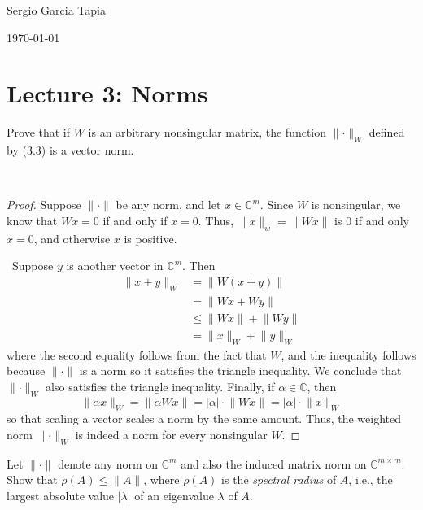 \documentclass[12pt]{article}
\newenvironment{ex}[2][Exercise]{\begin{trivlist}
		\item[\hskip \labelsep {\bfseries #1}\hskip \labelsep {\bfseries #2.}]}{\end{trivlist}}
\newenvironment{sol}[1][Solution]{\begin{trivlist}
		\item[\hskip \labelsep {\bfseries #1:}]}{\end{trivlist}}
\begin{document}

\noindent Sergio Garcia Tapia \hfill

 \hfill 

 \hfill 

\noindent\today
\section*{Lecture 3: Norms}

\begin{ex}{1}
	Prove that if $W$ is an arbitrary nonsingular matrix, the function $\lVert\cdot \rVert_W$
	defined by (3.3) is a vector norm.
\end{ex}

\begin{sol}
	\
	\begin{proof}
		Suppose $\lVert \cdot \rVert$ be any norm, and let $x\in \mathbb{C}^m$. Since $W$ is
		nonsingular, we know that $Wx=0$ if and only if $x=0$. Thus, $\lVert x\rVert_w = \lVert Wx\rVert$
		is 0 if and only $x=0$, and otherwise $x$ is positive.
		
		\
		Suppose $y$ is another vector in $\mathbb{C}^m$. Then
		\begin{align*}
			\lVert x + y\rVert_W &=\lVert W(x + y)\rVert\\
			&=\lVert Wx + Wy\rVert\\
			&\leq \lVert Wx\rVert + \lVert Wy\rVert\\
			&=\lVert x\rVert_W + \lVert y\rVert_W
		\end{align*}
		where the second equality follows from the fact that $W$, and the inequality follows
		because $\lVert \cdot\rVert$ is a norm so it satisfies the triangle inequality. We conclude
		that $\lVert \cdot \rVert_W$ also satisfies the triangle inequality. Finally, if
		$\alpha\in \mathbb{C}$, then
		\[
		\lVert \alpha x\rVert_W = \lVert \alpha Wx\rVert = |\alpha| \cdot \lVert Wx\rVert = |\alpha|\cdot \lVert x\rVert_W
		\]
		so that scaling a vector scales a norm by the same amount. Thus, the weighted norm
		$\lVert \cdot \rVert_W$ is indeed a norm for every nonsingular $W$.
	\end{proof}
\end{sol}

\begin{ex}{3.2}
	Let $\lVert \cdot \rVert$ denote any norm on $\mathbb{C}^m$ and also the induced matrix norm
	on $\mathbb{C}^{m\times m}$. Show that $\rho(A)\leq \lVert A\rVert$, where $\rho(A)$ is the
	\emph{spectral radius} of $A$, i.e., the largest absolute value $|\lambda|$ of an eigenvalue
	$\lambda$ of $A$.
\end{ex}
\end{document}
